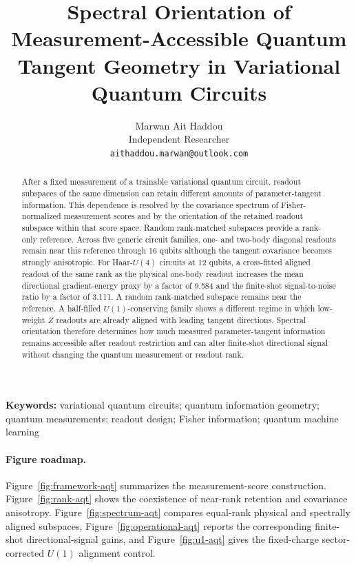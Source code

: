 \documentclass[11pt]{article}
\begin{document}
\title{Spectral Orientation of Measurement-Accessible Quantum Tangent Geometry in Variational Quantum Circuits}
\author{Marwan Ait Haddou\\
Independent Researcher\\
\texttt{aithaddou.marwan@outlook.com}}
\date{}
\maketitle

\noindent\textbf{Keywords:} variational quantum circuits; quantum information geometry; quantum measurements; readout design; Fisher information; quantum machine learning

\begin{abstract}
After a fixed measurement of a trainable variational quantum circuit, readout subspaces of the same dimension can retain different amounts of parameter-tangent information. This dependence is resolved by the covariance spectrum of Fisher-normalized measurement scores and by the orientation of the retained readout subspace within that score space. Random rank-matched subspaces provide a rank-only reference. Across five generic circuit families, one- and two-body diagonal readouts remain near this reference through 16 qubits although the tangent covariance becomes strongly anisotropic. For Haar-$U(4)$ circuits at 12 qubits, a cross-fitted aligned readout of the same rank as the physical one-body readout increases the mean directional gradient-energy proxy by a factor of 9.584 and the finite-shot signal-to-noise ratio by a factor of 3.111. A random rank-matched subspace remains near the reference. A half-filled $U(1)$-conserving family shows a different regime in which low-weight $Z$ readouts are already aligned with leading tangent directions. Spectral orientation therefore determines how much measured parameter-tangent information remains accessible after readout restriction and can alter finite-shot directional signal without changing the quantum measurement or readout rank.
\end{abstract}



\paragraph{Figure roadmap.}
Figure~\ref{fig:framework-aqt} summarizes the measurement-score construction. Figure~\ref{fig:rank-aqt} shows the coexistence of near-rank retention and covariance anisotropy. Figure~\ref{fig:spectrum-aqt} compares equal-rank physical and spectrally aligned subspaces, Figure~\ref{fig:operational-aqt} reports the corresponding finite-shot directional-signal gains, and Figure~\ref{fig:u1-aqt} gives the fixed-charge sector-corrected $U(1)$ alignment control.
\end{document}
